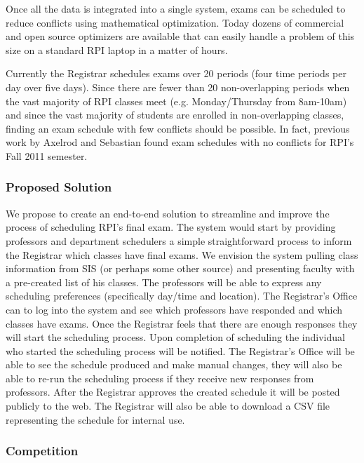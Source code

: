 \documentclass[11pt]{article}
\begin{document}
Once all the data is integrated into a single system, exams can be scheduled to reduce conflicts using mathematical optimization. Today dozens of commercial and open source optimizers are available that can easily handle a problem of this size on a standard RPI laptop in a matter of hours.

Currently the Registrar schedules exams over 20 periods (four time periods per day over five days).  Since there are fewer than 20 non-overlapping periods when the vast majority of RPI classes meet (e.g. Monday/Thursday from 8am-10am) and since the vast majority of students are enrolled in non-overlapping classes, finding an exam schedule with few conflicts should be possible.  In fact, previous work by Axelrod and Sebastian found exam schedules with no conflicts for RPI's Fall 2011 semester.

\subsubsection*{Proposed Solution}

We propose to create an end-to-end solution to streamline and improve the process of scheduling RPI's final exam.  The system would start by providing professors and department schedulers a simple straightforward process to inform the Registrar which classes have final exams.  We envision the system pulling class information from SIS (or perhaps some other source) and presenting faculty with a pre-created list of his classes.  The professors will be able to express any scheduling preferences (specifically day/time and location).  The Registrar's Office can to log into the system and see which professors have responded and which classes have exams.  Once the Registrar feels that there are enough responses they will start the scheduling process.  Upon completion of scheduling the individual who started the scheduling process will be notified.  The Registrar's Office will be able to see the schedule produced and make manual changes, they will also be able to re-run the scheduling process if they receive new responses from professors.  After the Registrar approves the created schedule it will be posted publicly to the web.  The Registrar will also be able to download a CSV file representing the schedule for internal use.

\subsubsection*{Competition}
\end{document}
